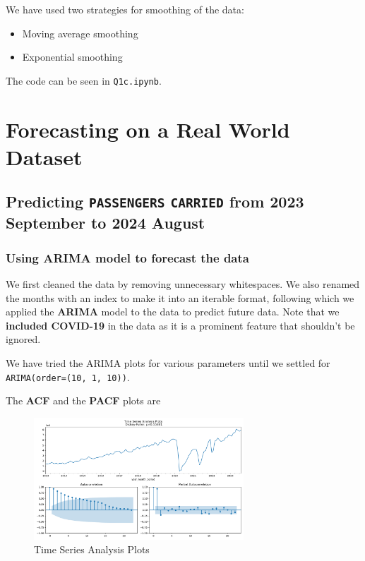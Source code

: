 \documentclass{article}
\begin{document}
We have used two strategies for smoothing of the data:
\begin{itemize}
    \item Moving average smoothing
    \item Exponential smoothing
\end{itemize}
The code can be seen in \texttt{Q1c.ipynb}.

\section{Forecasting on a Real World Dataset}

\subsection{Predicting \texttt{PASSENGERS} \texttt{CARRIED} from 2023 September
to 2024 August}

\subsubsection{Using ARIMA model to forecast the data}

We first cleaned the data by removing unnecessary whitespaces. We also renamed
the months with an index to make it into an iterable format, following which we
applied the \textbf{ARIMA} model to the data to predict future data. Note that we
\textbf{included COVID-19} in the data as it is a prominent feature that
shouldn't be ignored.

We have tried the ARIMA plots for various parameters until we settled for
\texttt{ARIMA(order=(10, 1, 10))}.

The \textbf{ACF} and the \textbf{PACF} plots are

\begin{figure}[H]
  \centering
  \includegraphics[width=0.7\textwidth]{TSPlot-2-1a.png}
  \caption{Time Series Analysis Plots}
\end{figure}
\end{document}
